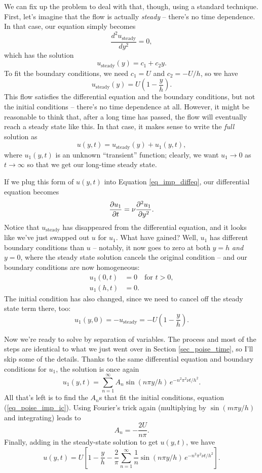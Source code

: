 We can fix up the problem to deal with that, though, using a standard technique.  First, let's imagine that the flow is actually \emph{steady} -- there's no time dependence.  In that case, our equation simply becomes
\[
\frac{d^2 u_\text{steady}}{dy^2} = 0,
\]
which has the solution
\[
u_\text{steady}(y) = c_1 + c_2 y.
\]
To fit the boundary conditions, we need $c_1 = U$ and $c_2 = -U/h$, so we have
\[
u_\text{steady}(y) = U \left( 1 - \frac{y}{h} \right).
\]
This flow satisfies the differential equation and the boundary conditions, but not the initial conditions -- there's no time dependence at all.  However, it might be reasonable to think that, after a long time has passed, the flow will eventually reach a steady state like this.  In that case, it makes sense to write the \emph{full} solution as
\[
u(y, t) = u_\text{steady}(y) + u_1(y, t),
\]
where $u_1(y, t)$ is an unknown ``transient'' function; clearly, we want $u_1 \to 0$ as $t \to \infty$ so that we get our long-time steady state. 

If we plug this form of $u(y,t)$ into Equation \ref{eq_imp_diffeq}, our differential equation becomes
\begin{equation}
\frac{\partial {u_1}}{\partial {t}} = \nu \frac{\partial^2 {u_1}}{\partial {y}^2}.
\end{equation}
Notice that $u_\text{steady}$ has disappeared from the differential equation, and it looks like we've just swapped out $u$ for $u_1$.  What have gained?  Well, $u_1$ has different boundary conditions than $u$ -- notably, it now goes to zero at both $y=h$ \emph{and} $y=0$, where the steady state solution cancels the original condition -- and our boundary conditions are now homogeneous:
\begin{align}
u_1(0, t) & = 0 \quad \text{for } t>0, \\
u_1(h, t) & = 0.
\end{align}
The initial condition has also changed, since we need to cancel off the steady state term there, too:
\begin{equation}
\label{eq_poise_imp_ic}
u_1(y, 0) = -u_\text{steady} = -U \left( 1 - \frac{y}{h} \right).
\end{equation}

Now we're ready to solve by separation of variables.  The process and most of the steps are identical to what we just went over in Section \ref{sec_poise_time}, so I'll skip some of the details.  Thanks to the same differential equation and boundary conditions for $u_1$, the solution is once again
\[
u_1(y, t) = \sum_{n=1}^\infty A_n \sin(n \pi y / h) \, e^{-n^2 \pi^2 \nu t / h^2}.
\]
All that's left is to find the $A_n$s that fit the initial conditions, equation (\ref{eq_poise_imp_ic}).  Using Fourier's trick again (multiplying by $\sin(m \pi y / h)$ and integrating) leads to 
\[
A_n = -\frac{2U}{n\pi}.
\]
Finally, adding in the steady-state solution to get $u(y, t)$, we have
\[
u(y, t) = U \left[ 1 - \frac{y}{h} - \frac{2}{\pi} \sum_{n=1}^\infty \frac{1}{n} \sin(n \pi y / h) \, e^{-n^2 \pi^2 \nu t / h^2} \right].
\]

